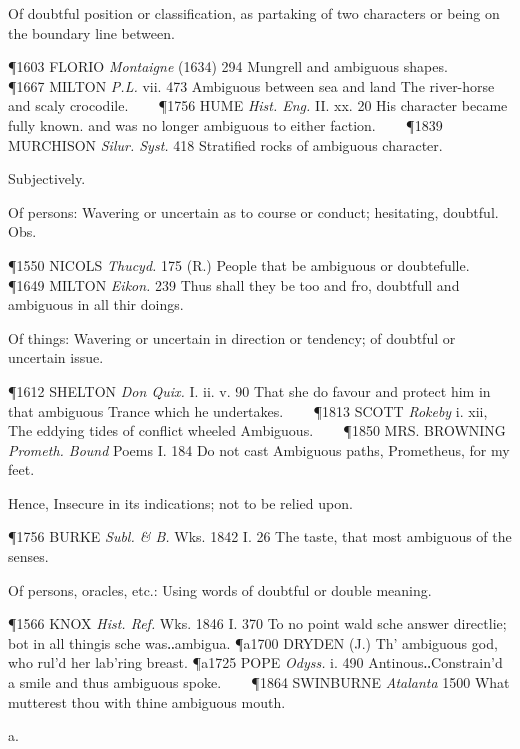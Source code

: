 \begin{description}[wide, labelwidth=!, labelindent=0pt]
\begin{myenumerate}
 Of doubtful position or classification, as partaking of two characters or being on the boundary line between. 

\P 1603 FLORIO \textit{Montaigne} (1634) 294 Mungrell and ambiguous shapes.    
\P 1667 MILTON \textit{P.L.} vii. 473 Ambiguous between sea and land The river-horse and scaly crocodile.    
\P 1756 HUME \textit{Hist. Eng.} II. xx. 20 His character became fully known. and was no longer ambiguous to either faction.    
\P 1839 MURCHISON \textit{Silur. Syst.} 418 Stratified rocks of ambiguous character.

 Subjectively. 

 Of persons: Wavering or uncertain as to course or conduct; hesitating, doubtful. Obs. 

\P 1550 NICOLS \textit{Thucyd.} 175 (R.) People that be ambiguous or doubtefulle.    
\P 1649 MILTON \textit{Eikon.} 239 Thus shall they be too and fro, doubtfull and ambiguous in all thir doings.

 Of things: Wavering or uncertain in direction or tendency; of doubtful or uncertain issue. 

\P 1612 SHELTON \textit{Don Quix.} I. ii. v. 90 That she do favour and protect him in that ambiguous Trance which he undertakes.    
\P 1813 SCOTT \textit{Rokeby} i. xii, The eddying tides of conflict wheeled Ambiguous.    
\P 1850 MRS. BROWNING \textit{Prometh. Bound} Poems I. 184 Do not cast Ambiguous paths, Prometheus, for my feet.

 Hence, Insecure in its indications; not to be relied upon. 

\P 1756 BURKE \textit{Subl. \& B.} Wks. 1842 I. 26 The taste, that most ambiguous of the senses.

 Of persons, oracles, etc.: Using words of doubtful or double meaning. 

\P 1566 KNOX \textit{Hist. Ref.} Wks. 1846 I. 370 To no point wald sche answer directlie; bot in all thingis sche was‥ambigua.
\P a1700 DRYDEN (J.) Th' ambiguous god, who rul'd her lab'ring breast.
\P a1725 POPE \textit{Odyss.} i. 490 Antinous‥Constrain'd a smile and thus ambiguous spoke.    
\P 1864 SWINBURNE \textit{Atalanta} 1500 What mutterest thou with thine ambiguous mouth.
\end{myenumerate}

  a.

\noindent  {}


\end{description}
